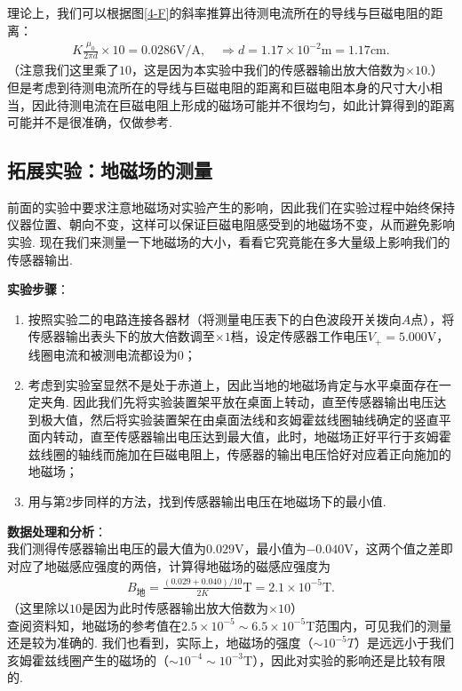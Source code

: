 \documentclass[UTF8,10pt,a4paper]{article}
\begin{document}
理论上，我们可以根据图\ref{4-F}的斜率推算出待测电流所在的导线与巨磁电阻的距离：
\begin{align}
    K\frac{\mu_0}{2\pi d}\times 10=0.0286\text{V}/\text{A},\quad\Longrightarrow d=1.17\times 10^{-2}\text{m}=1.17\text{cm}.
\end{align}
（注意我们这里乘了$10$，这是因为本实验中我们的传感器输出放大倍数为$\times 10$.）\\
但是考虑到待测电流所在的导线与巨磁电阻的距离和巨磁电阻本身的尺寸大小相当，因此待测电流在巨磁电阻上形成的磁场可能并不很均匀，如此计算得到的距离可能并不是很准确，仅做参考.

\clearpage

\subsection{拓展实验：地磁场的测量}

前面的实验中要求注意地磁场对实验产生的影响，因此我们在实验过程中始终保持仪器位置、朝向不变，这样可以保证巨磁电阻感受到的地磁场不变，从而避免影响实验. 现在我们来测量一下地磁场的大小，看看它究竟能在多大量级上影响我们的传感器输出.

\textbf{实验步骤}：
\begin{enumerate}
    \item 按照实验二的电路连接各器材（将测量电压表下的白色波段开关拨向$A$点），将传感器输出表头下的放大倍数调至$\times 1$档，设定传感器工作电压$V_+=5.000$V，线圈电流和被测电流都设为$0$；
    \item 考虑到实验室显然不是处于赤道上，因此当地的地磁场肯定与水平桌面存在一定夹角. 因此我们先将实验装置架平放在桌面上转动，直至传感器输出电压达到极大值，然后将实验装置架在由桌面法线和亥姆霍兹线圈轴线确定的竖直平面内转动，直至传感器输出电压达到最大值，此时，地磁场正好平行于亥姆霍兹线圈的轴线而施加在巨磁电阻上，传感器的输出电压恰好对应着正向施加的地磁场；
    \item 用与第2步同样的方法，找到传感器输出电压在地磁场下的最小值.
\end{enumerate}

\textbf{数据处理和分析}：\\
我们测得传感器输出电压的最大值为$0.029$V，最小值为$-0.040$V，这两个值之差即对应了地磁感应强度的两倍，计算得地磁场的磁感应强度为
\begin{align}
    B_{\text{地}}=\frac{(0.029+0.040)/10}{2K}\text{T}=2.1\times 10^{-5}\text{T}.
\end{align}
（这里除以$10$是因为此时传感器输出放大倍数为$\times 10$）\\
查阅资料知，地磁场的参考值在$2.5\times 10^{-5}\sim 6.5\times 10^{-5}$T范围内，可见我们的测量还是较为准确的. 我们也看到，实际上，地磁场的强度（$\sim 10^{-5}T$）是远远小于我们亥姆霍兹线圈产生的磁场的（$\sim 10^{-4}\sim 10^{-3}$T），因此对实验的影响还是比较有限的.
\end{document}
